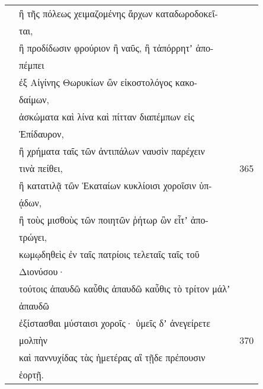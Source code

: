 \documentclass[13pt]{article}
\begin{document}
\begin{greek}
\begin{multicols}{2}
\begin{parcolumns}[colwidths={1=1.5em, 2=0.9\linewidth}]{2}
\end{parcolumns}
\end{multicols}

\newpage
\begin{spacing}{1.5}
\begin{tabularx}{\textwidth}{@{}lXr@{}}
& ἢ τῆς πόλεως χειμαζομένης ἄρχων καταδωροδοκεῖ- & \\
& \hspace{3em}ται, &  \\
& ἢ προδίδωσιν φρούριον ἢ ναῦς, ἢ τἀπόρρητʼ ἀπο- & \\
& \hspace{3em}πέμπει &  \\
& ἐξ Αἰγίνης Θωρυκίων ὢν εἰκοστολόγος κακο- & \\
&\hspace{3em}δαίμων, &  \\
& ἀσκώματα καὶ λίνα καὶ πίτταν διαπέμπων εἰς & \\ 
&\hspace{3em}Ἐπίδαυρον, &  \\
& ἢ χρήματα ταῖς τῶν ἀντιπάλων ναυσὶν παρέχειν & \\ 
&\hspace{3em}τινὰ πείθει, & 365 \\
& ἢ κατατιλᾷ τῶν Ἑκαταίων κυκλίοισι χοροῖσιν ὑπ- & \\
&\hspace{3em}ᾴδων, &  \\
& ἢ τοὺς μισθοὺς τῶν ποιητῶν ῥήτωρ ὢν εἶτʼ ἀπο- & \\
&\hspace{3em}τρώγει, &  \\
& κωμῳδηθεὶς ἐν ταῖς πατρίοις τελεταῖς ταῖς τοῦ & \\ 
&\hspace{3em}Διονύσου· &  \\
& τούτοις ἀπαυδῶ καὖθις ἀπαυδῶ καὖθις τὸ τρίτον μάλʼ & \\ 
&\hspace{3em}ἀπαυδῶ &  \\
& ἐξίστασθαι μύσταισι χοροῖς· ὑμεῖς δʼ ἀνεγείρετε & \\ 
&\hspace{3em}μολπὴν & 370 \\
& καὶ παννυχίδας τὰς ἡμετέρας αἳ τῇδε πρέπουσιν & \\ 
&\hspace{3em}ἑορτῇ. &  \\

\end{tabularx}
\end{spacing}


\end{greek}
\end{document}

